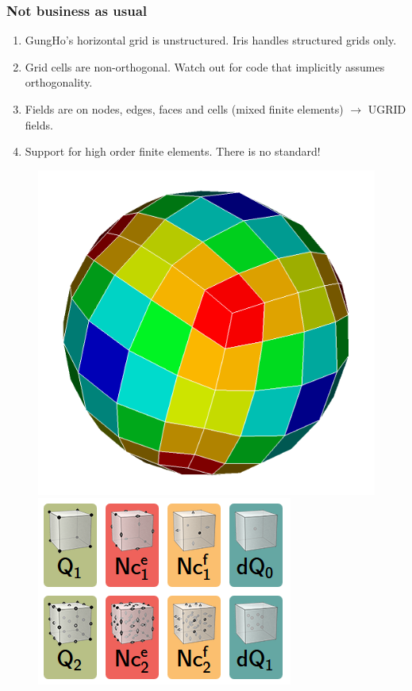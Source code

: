 \documentclass[aspectratio=169]{beamer}
\begin{document}
\begin{frame}[t]
  \frametitle{Not business as usual}
    \begin{block}{}
      \begin{enumerate}%
	  \item GungHo's horizontal grid is {\color{red} unstructured}. Iris handles structured grids only.
      \item Grid cells are {\color{red} non-orthogonal}. Watch out for code that implicitly assumes orthogonality.
      \item Fields are on nodes, {\color{red} edges, faces} and cells (mixed finite elements) $\rightarrow$ UGRID fields.
      \item Support for {\color{red} high order} finite elements. There is no standard! 
      \end{enumerate}
  \end{block}
\begin{figure}[!htb]
\centering
\begin{minipage}{0.4\textwidth}
  \centering
  \includegraphics[width=0.45 \linewidth]{cubedSphere.png}
\end{minipage}%
\begin{minipage}{.5\textwidth}
  \centering
  \includegraphics[width=0.45 \linewidth]{nodeEdgeFaceCellElements.png}
\end{minipage}
\end{figure}
\end{frame}
\end{document}
